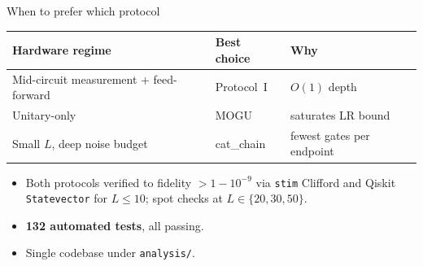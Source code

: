 \documentclass[aspectratio=169,10pt]{beamer}
\begin{document}
\begin{frame}{When to prefer which protocol}
  \centering\footnotesize
  \begin{tabular}{lll}
    \toprule
    \textbf{Hardware regime} & \textbf{Best choice} & \textbf{Why} \\
    \midrule
    Mid-circuit measurement + feed-forward & Protocol~I & $O(1)$ depth \\
    Unitary-only                           & MOGU       & saturates LR bound \\
    Small $L$, deep noise budget           & cat\_chain & fewest gates per endpoint \\
    \bottomrule
  \end{tabular}

  \vspace{0.6em}
  \begin{itemize}\footnotesize\setlength{\itemsep}{0.15em}
    \item Both protocols verified to fidelity $>1-10^{-9}$ via \texttt{stim}
          Clifford and Qiskit \texttt{Statevector} for $L\le 10$;
          spot checks at $L\in\{20,30,50\}$.
    \item \textbf{132 automated tests}, all passing.
    \item Single codebase under \texttt{analysis/}.
  \end{itemize}
\end{frame}
\end{document}
